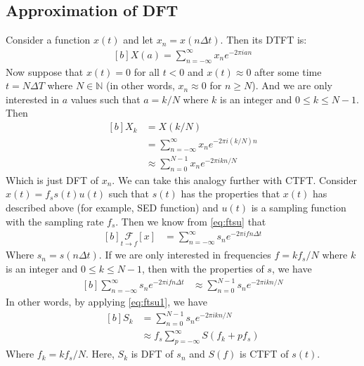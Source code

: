 \documentclass[letterpaper, 11pt]{article}
\newcommand{\fsum}[1]{\sum_{#1 = -\infty}^{\infty}} %
\newcommand{\fourier}[3]{\underset{#1 \rightarrow #3}{\mathcal{F}}[#2]} %
\newcommand{\ssum}[1]{\sum_{#1 = 0}^{N - 1}} %
\newcommand{\dft}[3]{\ssum{#1} #2 e^{-2\pi i#3#1/N}} %
\newcommand{\dtft}[3]{\fsum{#1} #2 e^{-2\pi i#3#1}}
\numberwithin{equation}{section}
\numberwithin{figure}{section}
\numberwithin{table}{section}
\begin{document}
\subsection{Approximation of DFT}
Consider a function \(x(t)\) and let \(x_{n} = x(n\Delta t)\). Then its DTFT is:
\begin{equation}
	\begin{aligned}[b]
		X(a) = \dtft{n}{x_{n}}{a} 
	\end{aligned}
\end{equation}
Now suppose that \(x(t) = 0\) for all \(t < 0\) and \(x(t) \approx 0\) after some time \(t = N\Delta T\) where \(N \in \mathbb{N}\) (in other words, \(x_{n} \approx 0\) for \(n \ge N\)). And we are only interested in \(a\) values such that \(a = k/N\) where \(k\) is an integer and \(0 \leq k \leq N - 1\). Then
\begin{equation}
	\begin{aligned}[b]
		X_{k} 	&= X(k/N)\\
			&= \dtft{n}{x_{n}}{(k/N)}\\
			&\approx \dft{n}{x_{n}}{k}
	\end{aligned}
\end{equation}
Which is just DFT of \(x_{n}\). We can take this analogy further with CTFT. Consider \(x(t)=f_{s} s(t)u(t)\) such that \(s(t)\) has the properties that \(x(t)\) has described above (for example, SED function) and \(u(t)\) is a sampling function with the sampling rate \(f_{s}\). Then we know from \eqref{eq:ftsu} that
\begin{equation}
	\begin{aligned}[b]
		\fourier{t}{x}{f}
			&= \fsum{n} s_{n} e^{-2\pi ifn\Delta t} 
	\end{aligned}
\end{equation}
Where \(s_{n} = s(n\Delta t)\). If we are only interested in frequencies \(f = kf_{s}/N\) where \(k\) is an integer and \(0 \leq k \leq N - 1\), then with the properties of \(s\), we have
\begin{equation}
	\begin{aligned}[b]
		\fsum{n} s_{n} e^{-2\pi ifn\Delta t}
			&\approx \dft{n}{s_{n}}{k}
	\end{aligned}
\end{equation}
In other words, by applying \eqref{eq:ftsu1}, we have
\begin{equation}
	\begin{aligned}[b]
		S_{k}	&= \dft{n}{s_{n}}{k}\\
			&\approx f_{s}\fsum{p} S(f_{k} + pf_{s}) 
	\end{aligned}
\end{equation}
Where \(f_{k} = kf_{s}/N\). Here, \(S_{k}\) is DFT of \(s_{n}\) and \(S(f)\) is CTFT of \(s(t)\).
\clearpage
\pagestyle{plain}
\printbibliography
{}
\printindex
\end{document}

